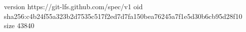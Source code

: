 version https://git-lfs.github.com/spec/v1
oid sha256:c4b24f55a323b2d7535c517f2ed7d7fa150bea76245a7f1e5d30b6cb95d28f10
size 43840
